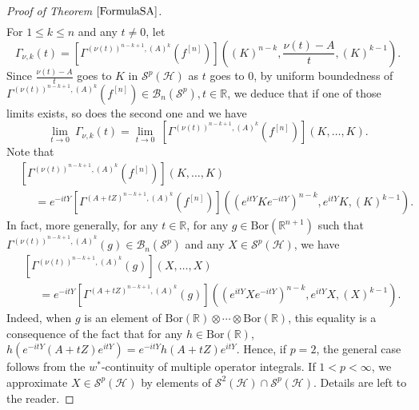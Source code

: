 \documentclass[12pt]{amsart}
\theoremstyle{remark}
\begin{document}
\begin{proof}[Proof of Theorem $\ref{FormulaSA}$]
\begin{align*}
\end{align*}
For $1\leq k\leq n$ and any $t\neq 0$, let
$$\displaystyle \Gamma_{\nu,k}(t) = \left[ \Gamma^{(\nu(t))^{n-k+1}, (A)^k}(f^{[n]})\right]\left( (K)^{n-k}, \frac{\nu(t) - A}{t} , (K)^{k-1} \right).$$
Since $\frac{\nu(t) - A}{t}$ goes to $K$ in $\mathcal{S}^p(\mathcal{H})$ as $t$ goes to $0$, by uniform boundedness of $\Gamma^{(\nu(t))^{n-k+1}, (A)^k}(f^{[n]}) \in \mathcal{B}_n(\mathcal{S}^p), t\in \mathbb{R}$, we deduce that if one of those limits exists, so does the second one and we have
$$
\underset{t \to 0}{\lim} \ \Gamma_{\nu,k}(t) = \underset{t \to 0}{\lim} \ \left[ \Gamma^{(\nu(t))^{n-k+1}, (A)^k}(f^{[n]})\right]\left( K,\ldots,K \right).
$$
Note that
\begin{align*}
& \left[ \Gamma^{(\nu(t))^{n-k+1}, (A)^k}(f^{[n]})\right]\left( K,\ldots,K \right) \\
& \ \ \ \ \ \ = e^{-itY}\left[ \Gamma^{(A+tZ)^{n-k+1}, (A)^k}(f^{[n]})\right]\left((e^{itY}Ke^{-itY})^{n-k},e^{itY}K, (K)^{k-1} \right).
\end{align*}
In fact, more generally, for any $t\in \mathbb{R}$, for any $g\in \text{Bor}(\mathbb{R}^{n+1})$ such that $\Gamma^{(\nu(t))^{n-k+1}, (A)^k}(g) \in \mathcal{B}_n(\mathcal{S}^p)$ and any $X \in  \mathcal{S}^p(\mathcal{H})$, we have
\begin{align*}
& \left[ \Gamma^{(\nu(t))^{n-k+1}, (A)^k}(g)\right]\left(X, \ldots, X \right) \\
& \ \ \ \ \ \ = e^{-itY}\left[ \Gamma^{(A+tZ)^{n-k+1}, (A)^k}(g)\right]\left((e^{itY}Xe^{-itY})^{n-k},e^{itY}X, (X)^{k-1} \right).
\end{align*}
Indeed, when $g$ is an element of $\text{Bor}(\mathbb{R}) \otimes \cdots \otimes \text{Bor}(\mathbb{R})$, this equality is a consequence of the fact that for any $h \in \text{Bor}(\mathbb{R})$, $h(e^{-itY}(A+tZ)e^{itY}) = e^{-itY}h(A+tZ)e^{itY}$. Hence, if $p=2$, the general case follows from the $w^*$-continuity of multiple operator integrals. If $1<p<\infty$, we approximate $X\in \mathcal{S}^p(\mathcal{H})$ by elements of $\mathcal{S}^2(\mathcal{H}) \cap \mathcal{S}^p(\mathcal{H})$. Details are left to the reader.


\end{proof}
\end{document}
